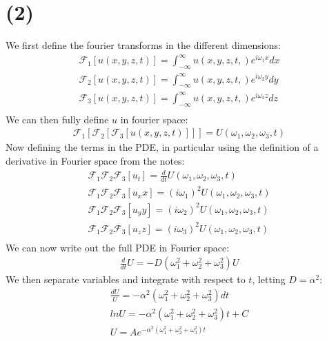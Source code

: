 \documentclass{article}
\begin{document}
\section*{\textbf{(2)}}
We first define the fourier transforms in the different dimensions:
\begin{equation}
\begin{aligned}
\mathcal{F}_1[u(x,y,z,t)] = \int_{-\infty}^\infty u(x,y,z,t,)e^{i\omega_1 x}dx\\
\mathcal{F}_2[u(x,y,z,t)] = \int_{-\infty}^\infty u(x,y,z,t,)e^{i\omega_2 y}dy\\
\mathcal{F}_3[u(x,y,z,t)] = \int_{-\infty}^\infty u(x,y,z,t,)e^{i\omega_3 z}dz\\
\end{aligned}
\end{equation}
We can then fully define $u$ in fourier space:
\begin{equation}
\begin{aligned}
\mathcal{F}_1[\mathcal{F}_2[\mathcal{F}_3[u(x,y,z,t)]]] = U(\omega_1, \omega_2, \omega_3, t)
\end{aligned}
\end{equation}
Now defining the terms in the PDE, in particular using the definition of a derivative in Fourier space from the notes:
\begin{equation}
\begin{aligned}
\mathcal{F}_1\mathcal{F}_2\mathcal{F}_3[u_t] = \frac{d}{dt}U(\omega_1, \omega_2, \omega_3, t)\\
\mathcal{F}_1\mathcal{F}_2\mathcal{F}_3[u_xx] = (i\omega_1)^2 U(\omega_1, \omega_2, \omega_3, t)\\
\mathcal{F}_1\mathcal{F}_2\mathcal{F}_3[u_yy] = (i\omega_2)^2 U(\omega_1, \omega_2, \omega_3, t)\\
\mathcal{F}_1\mathcal{F}_2\mathcal{F}_3[u_zz] = (i\omega_3)^2 U(\omega_1, \omega_2, \omega_3, t)\\
\end{aligned}
\end{equation}
We can now write out the full PDE in Fourier space:
\begin{equation}
\begin{aligned}
\frac{d}{dt}U = -D(\omega_1^2 + \omega_2^2 + \omega_3^2)U
\end{aligned}
\end{equation}
We then separate variables and integrate with respect to $t$, letting $D = \alpha^2$:
\begin{equation}
\begin{aligned}
\frac{dU}{U} = -\alpha^2(\omega_1^2 + \omega_2^2 + \omega_3^2)dt\\
lnU = -\alpha^2(\omega_1^2 + \omega_2^2 + \omega_3^2)t+ C\\
U = Ae^{-\alpha^2(\omega_1^2 + \omega_2^2 + \omega_3^2)t}
\end{aligned}
\end{equation}
\end{document}
